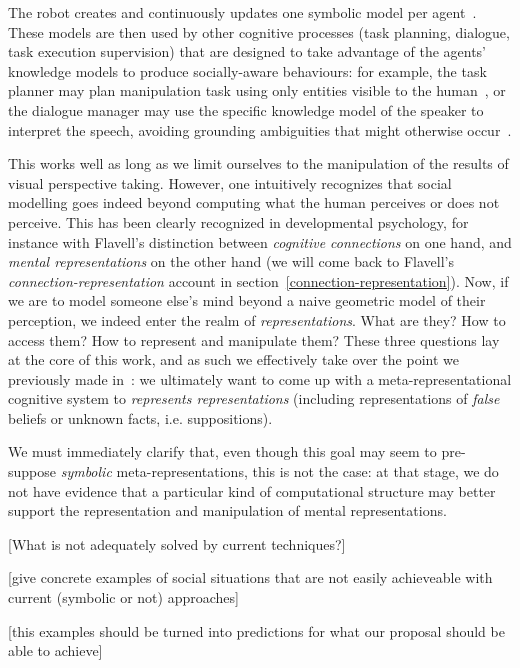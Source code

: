 \documentclass[a4paper]{article}
\newcommand{\ie}{i.e.\xspace}
\begin{document}
The robot creates and continuously updates one symbolic model per
agent~\cite{lemaignan2010oro}. These models are then used by other cognitive
processes (task planning, dialogue, task execution supervision) that are
designed to take advantage of the agents' knowledge models to produce
socially-aware behaviours: for example, the task planner may plan manipulation
task using only entities visible to the human~\cite{lallement2014hatp}, or the
dialogue manager may use the specific knowledge model of the speaker to
interpret the speech, avoiding grounding ambiguities that might otherwise
occur~\cite{lemaignan2011grounding}.

This works well as long as we limit ourselves to the manipulation of the results
of visual perspective taking. However, one intuitively recognizes that social
modelling goes indeed beyond computing what the human perceives or does not
perceive. This has been clearly recognized in developmental psychology, for
instance with Flavell's distinction between \emph{cognitive connections} on one
hand, and \emph{mental representations} on the other hand (we will come back to
Flavell's \emph{connection-representation} account in
section~\ref{connection-representation}). Now, if we are to model someone else's
mind beyond a naive geometric model of their perception, we indeed enter the
realm of \emph{representations}. What are they? How to access them? How to
represent and manipulate them? These three questions lay at the core of this
work, and as such we effectively take over the point we previously made
in~\cite{lemaignan2015mutual}:  we ultimately want to come up with a
meta-representational cognitive system to \emph{represents
representations} (including representations of \emph{false} beliefs or unknown
facts, \ie suppositions).

We must immediately clarify that, even though this goal may seem to pre-suppose
\emph{symbolic} meta-representations, this is not the case: at that stage, we do
not have evidence that a particular kind of computational structure may better
support the representation and manipulation of mental representations.

[What is not adequately solved by current techniques?]

[give concrete examples of social situations that are not easily achieveable
with current (symbolic or not) approaches]

[this examples should be turned into predictions for what our proposal should be
able to achieve]
\end{document}
